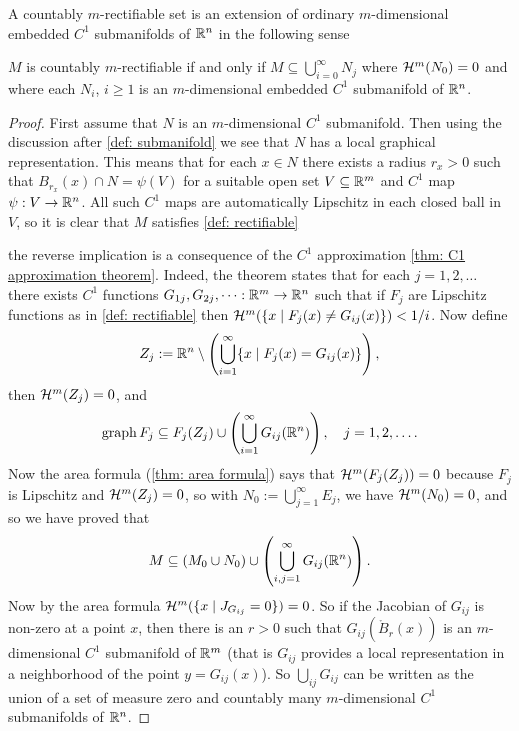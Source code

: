 A countably $m$-rectifiable set is an extension of ordinary $m$-dimensional embedded $C^1$ submanifolds of $\mathbb{R}^n$ in the following sense
\begin{lemma}\label{lem: rectifiable lemma}
$M$ is countably $m$-rectifiable if and only if $M \subseteq \bigcup_{i=0}^{\infty}N_{j}$ where $\mathcal{H}^{m}(N_{0})=0$ and where each $N_{i}$, $i \ge 1$ is an $m$-dimensional embedded $C^{1}$ submanifold of $\mathbb{R}^{n}$.
\end{lemma}
\begin{proof}
First assume that $N$ is an $m$-dimensional $C^{1}$ submanifold. Then using the discussion after \cref{def: submanifold} we see that $N$ has a local graphical representation. This means that for each $x \in N$ there exists a radius $r_{x} > 0$ such that $B_{r_{x}}(x) \cap N = \psi(V)$ for a suitable open set $V \subseteq \mathbb{R}^{m}$ and $C^{1}$ map $\psi:V \to \mathbb{R}^{n}$. All such $C^{1}$ maps are automatically Lipschitz in each closed ball in $V$, so it is clear that $M$ satisfies \cref{def: rectifiable}

the reverse implication is a consequence of the $C^{1}$ approximation \cref{thm: C1 approximation theorem}. Indeed, the theorem states that for each $j=1,2, \dots$ there exists $C^{1}$ functions $G_{1j}, G_{2j}, \dots:\mathbb{R}^{m} \to \mathbb{R}^{n}$ such that if $F_{j}$ are Lipschitz functions as in \cref{def: rectifiable} then $\mathcal{H}^{m}(\{ x \mid F_{j}(x) \neq G_{ij}(x)\})<1/i$. Now define
\begin{align*}
	Z_{j} := \mathbb{R}^{n} \setminus \left( \bigcup_{i=1}^{\infty} \{ x \mid F_{j}(x) = G_{ij}(x) \} \right),
\end{align*}
then $\mathcal{H}^{m}(Z_{j})=0$, and
\begin{align*}
	\operatorname{graph} F_{j} \subseteq F_{j}(Z_{j}) \cup \left( \bigcup_{i=1}^{\infty} G_{ij}(\mathbb{R}^{n}) \right), \quad j=1,2, \dots.
\end{align*}
Now the area formula (\cref{thm: area formula}) says that $\mathcal{H}^{m}(F_{j}(Z_{j}))=0$ because $F_{j}$ is Lipschitz and $\mathcal{H}^{m}(Z_{j})=0$,
so with $N_{0} := \bigcup_{j=1}^{\infty}E_{j}$, we have $\mathcal{H}^{m}(N_{0})=0$, and so we have proved that
\begin{align*}
	M \subseteq (M_{0} \cup N_{0}) \cup \left( \bigcup_{i,j=1}^{\infty} G_{ij}(\mathbb{R}^{n}) \right).
\end{align*}
Now by the area formula $\mathcal{H}^{m}(\{x \mid J_{G_{ij}} = 0 \}) = 0$. So if the Jacobian of $G_{ij}$ is non-zero at a point $x$, then there is an $r > 0$ such that $G_{ij}(\mathring{B}_{r}(x))$ is an $m$-dimensional $C^{1}$ submanifold of $\mathbb{R}^{m}$ (that is $G_{ij}$ provides a local representation in a neighborhood of the point $y = G_{ij}(x)$). So $\bigcup_{ij} G_{ij}$ can be written as the union of a set of measure zero and countably many $m$-dimensional $C^{1}$ submanifolds of $\mathbb{R}^{n}$.
\end{proof}

